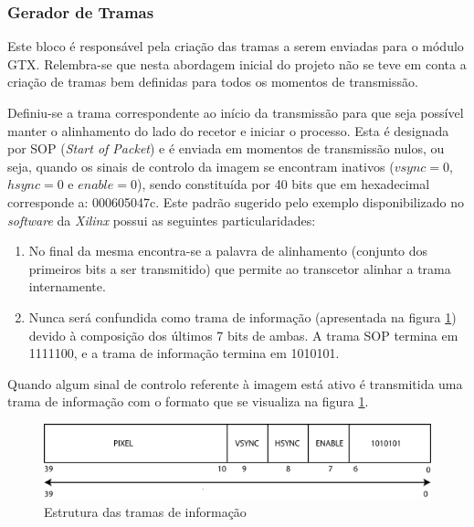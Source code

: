 \documentclass[11pt,a4paper]{article}
\begin{document}
	\subsubsection*{Gerador de Tramas} \label{subsub:serial_frameGenerator}
	
	Este bloco é responsável pela criação das tramas a serem enviadas para o módulo GTX. Relembra-se que nesta abordagem inicial do projeto não se teve em conta a criação de tramas bem definidas para todos os momentos de transmissão. 
	
	Definiu-se a trama correspondente ao início da transmissão para que seja possível manter o alinhamento do lado do recetor e iniciar o processo. Esta é designada por  SOP (\textit{Start of Packet}) e é enviada em momentos de transmissão nulos, ou seja, quando os sinais de controlo da imagem se encontram inativos ($vsync = 0$, $hsync = 0$ e $enable = 0$), sendo constituída por 40 bits que em hexadecimal corresponde a: 000605047c. Este padrão sugerido pelo exemplo disponibilizado no \textit{software} da \textit{Xilinx} possui as seguintes particularidades:
	
	\begin{enumerate}
		\item No final da mesma encontra-se a palavra de alinhamento (conjunto dos primeiros bits a ser transmitido) que permite ao transcetor alinhar a trama internamente.
		\item Nunca será confundida como trama de informação (apresentada na figura \ref{fig:trama_abordagem_inicial}) devido à composição dos últimos 7  bits de ambas. A trama SOP termina em 1111100, e a trama de informação termina em 1010101.
	\end{enumerate}
	
	
	
	Quando algum sinal de controlo referente à imagem está ativo é transmitida uma trama de informação com o formato que se visualiza na figura \ref{fig:trama_abordagem_inicial}.
	
	\begin{figure}[h!]
		\begin{center}
			\leavevmode
			\includegraphics[width=1.0\textwidth]{trama_abordagem_inicial}
			\caption[Estrutura das tramas de informação]{Estrutura das tramas de informação}
			\label{fig:trama_abordagem_inicial}
		\end{center}
	\end{figure}
	
\end{document}
